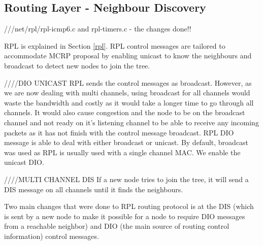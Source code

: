 

\subsection{Routing Layer - Neighbour Discovery}
///net/rpl/rpl-icmp6.c and rpl-timers.c - the changes done!!

RPL is explained in Section \ref{rpl}. RPL control messages are tailored to accommodate MCRP proposal by enabling unicast to know the neighbours and broadcast to detect new nodes to join the tree.



////DIO UNICAST
RPL sends the control messages as broadcast. However, as we are now dealing with multi channels, using broadcast for all channels would waste the bandwidth and costly as it would take a longer time to go through all channels. It would also cause congestion and the node to be on the broadcast channel and not ready on it's listening channel to be able to receive any incoming packets as it has not finish with the control message broadcast. RPL DIO message is able to deal with either broadcast or unicast. By default, broadcast was used as RPL is usually used with a single channel MAC. We enable the unicast DIO.

////MULTI CHANNEL DIS
If a new node tries to join the tree, it will send a DIS message on all channels until it finds the neighbours. 

Two main changes that were done to RPL routing protocol is at the DIS (which is sent by a new node to make it possible for a node to require DIO messages from a reachable neighbor) and DIO (the main source of routing control information) control messages.

